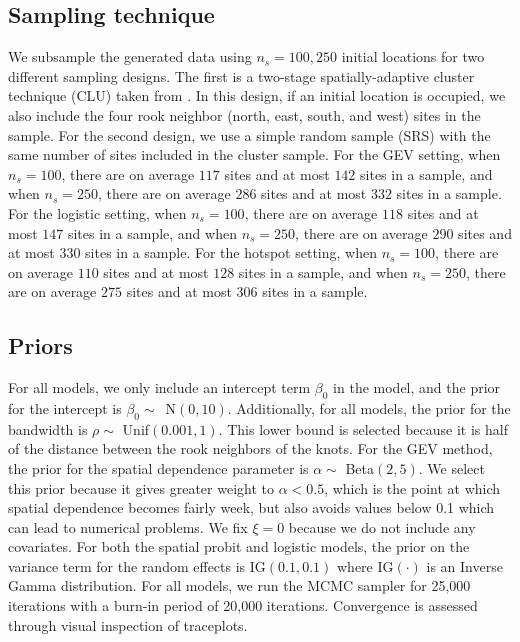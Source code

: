\documentclass[11pt]{article}
\begin{document}
\subsection{Sampling technique} \label{rbs:simsampling}
We subsample the generated data using $n_s = 100, 250$ initial locations for two different sampling designs.
The first is a two-stage spatially-adaptive cluster technique (CLU) taken from \citet{Pacifici2016}.
In this design, if an initial location is occupied, we also include the four rook neighbor (north, east, south, and west) sites in the sample.
For the second design, we use a simple random sample (SRS) with the same number of sites included in the cluster sample.
For the GEV setting, when $n_s = 100$, there are on average $117$ sites and at most $142$ sites in a sample, and when $n_s = 250$, there are on average $286$ sites and at most $332$ sites in a sample.
For the logistic setting, when $n_s = 100$, there are on average $118$ sites and at most $147$ sites in a sample, and when $n_s = 250$, there are on average $290$ sites and at most $330$ sites in a sample.
For the hotspot setting, when $n_s = 100$, there are on average $110$ sites and at most $128$ sites in a sample, and when $n_s = 250$, there are on average $275$ sites and at most $306$ sites in a sample.

\subsection{Priors} \label{rbs:simpriors}
For all models, we only include an intercept term $\beta_0$ in the model, and the prior for the intercept is \mbox{$\beta_0 \sim$ N$(0, 10)$}.
Additionally, for all models, the prior for the bandwidth is $\rho \sim$ Unif$(0.001, 1)$.
This lower bound is selected because it is half of the distance between the rook neighbors of the knots.
For the GEV method, the prior for the spatial dependence parameter is $\alpha \sim$ Beta$(2, 5)$.
We select this prior because it gives greater weight to $\alpha < 0.5$, which is the point at which spatial dependence becomes fairly week, but also avoids values below 0.1 which can lead to numerical problems.
We fix $\xi = 0$ because we do not include any covariates.
For both the spatial probit and logistic models, the prior on the variance term for the random effects is IG$(0.1, 0.1)$ where IG$(\cdot)$ is an Inverse Gamma distribution.
For all models, we run the MCMC sampler for 25,000 iterations with a burn-in period of 20,000 iterations.
Convergence is assessed through visual inspection of traceplots.
\end{document}
